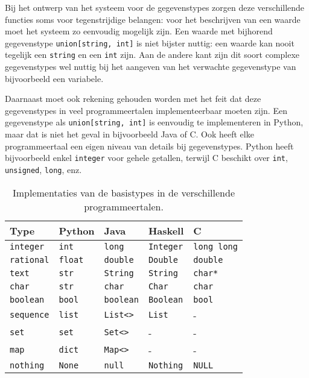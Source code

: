 Bij het ontwerp van het systeem voor de gegevenstypes zorgen deze verschillende functies soms voor tegenstrijdige belangen: voor het beschrijven van een waarde moet het systeem zo eenvoudig mogelijk zijn.
Een waarde met bijhorend gegevenstype \texttt{union[string, int]} is niet bijster nuttig: een waarde kan nooit tegelijk een \texttt{string} en een \texttt{int} zijn.
Aan de andere kant zijn dit soort complexe gegevenstypes wel nuttig bij het aangeven van het verwachte gegevenstype van bijvoorbeeld een variabele.

Daarnaast moet ook rekening gehouden worden met het feit dat deze gegevenstypes in veel programmeertalen implementeerbaar moeten zijn.
Een gegevenstype als \texttt{union[string, int]} is eenvoudig te implementeren in Python, maar dat is niet het geval in bijvoorbeeld Java of C\@.
Ook heeft elke programmeertaal een eigen niveau van details bij gegevenstypes.
Python heeft bijvoorbeeld enkel \texttt{integer} voor gehele getallen, terwijl C beschikt over \texttt{int}, \texttt{unsigned}, \texttt{long}, enz.

\begin{table}
    \centering
    \caption{Implementaties van de basistypes in de verschillende programmeertalen.}
    \label{tab:basistypes}
    \begin{tabular}{|l|llll|}
        \hline
        Type              & Python          & Java              & Haskell           & C \\
        \hline
        \texttt{integer}  & \texttt{int}    & \texttt{long}     & \texttt{Integer}  & \texttt{long long} \\
        \texttt{rational} & \texttt{float}  & \texttt{double}   & \texttt{Double}   & \texttt{double}    \\
        \texttt{text}     & \texttt{str}    & \texttt{String}   & \texttt{String}   & \texttt{char*}     \\
        \texttt{char}     & \texttt{str}    & \texttt{char}     & \texttt{Char}     & \texttt{char}      \\
        \texttt{boolean}  & \texttt{bool}   & \texttt{boolean}  & \texttt{Boolean}  & \texttt{bool}      \\
        \texttt{sequence} & \texttt{list}   & \texttt{List<>}   & \texttt{List}     & -                  \\
        \texttt{set}      & \texttt{set}    & \texttt{Set<>}    & -                 & -                  \\
        \texttt{map}      & \texttt{dict}   & \texttt{Map<>}    & -                 & -                  \\
        \texttt{nothing}  & \texttt{None}   & \texttt{null}     & \texttt{Nothing}  & \texttt{NULL}      \\
        \hline
    \end{tabular}
\end{table}

